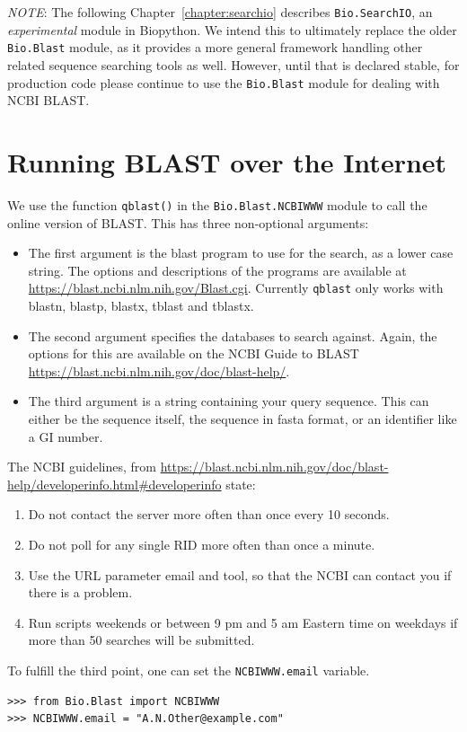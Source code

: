 \emph{NOTE}: The following Chapter~\ref{chapter:searchio} describes
\verb|Bio.SearchIO|, an \emph{experimental} module in Biopython. We
intend this to ultimately replace the older \verb|Bio.Blast| module, as it
provides a more general framework handling other related sequence
searching tools as well. However, until that is declared stable, for
production code please continue to use the  \verb|Bio.Blast| module
for dealing with NCBI BLAST.

\section{Running BLAST over the Internet}

We use the function \verb|qblast()| in the \verb|Bio.Blast.NCBIWWW| module
to call the online version of BLAST.  This has three non-optional arguments:
\begin{itemize}
\item The first argument is the blast program to use for the search, as a
lower case string. The options and descriptions of the programs are
available at \url{https://blast.ncbi.nlm.nih.gov/Blast.cgi}.
Currently \verb|qblast| only works with blastn, blastp, blastx, tblast
and tblastx.
\item The second argument specifies the databases to search against. Again,
the options for this are available on the NCBI Guide to BLAST
\url{https://blast.ncbi.nlm.nih.gov/doc/blast-help/}.
\item The third argument is a string containing your query sequence.  This
can either be the sequence itself, the sequence in fasta format,
or an identifier like a GI number.
\end{itemize}

The NCBI guidelines, from \url{https://blast.ncbi.nlm.nih.gov/doc/blast-help/developerinfo.html#developerinfo} state:
\begin{enumerate}
\item Do not contact the server more often than once every 10 seconds.
\item Do not poll for any single RID more often than once a minute.
\item Use the URL parameter email and tool, so that the NCBI can contact you if there is a problem.
\item Run scripts weekends or between 9 pm and 5 am Eastern time on weekdays if more than 50 searches will be submitted.
\end{enumerate}

To fulfill the third point, one can set the \verb|NCBIWWW.email| variable.
\begin{verbatim}
>>> from Bio.Blast import NCBIWWW
>>> NCBIWWW.email = "A.N.Other@example.com"
\end{verbatim}

